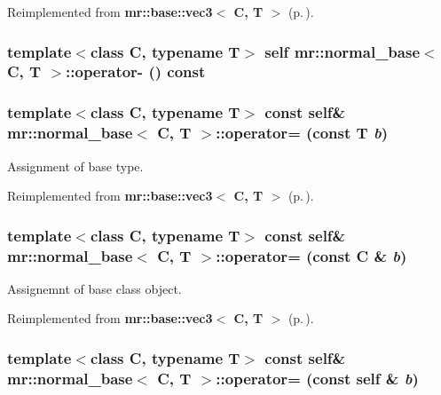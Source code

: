 Reimplemented from {\bf mr::base::vec3$<$ C, T $>$} {\rm (p.\,\pageref{structmr_1_1base_1_1vec3_z40_7})}.
\subsubsection{\setlength{\rightskip}{0pt plus 5cm}template$<$class C, typename T$>$ {\bf self} {\bf mr::normal\_\-base}$<$ C, T $>$::operator- () const\hspace{0.3cm}{\tt  [inline]}}\label{structmr_1_1normal__base_a16}


\subsubsection{\setlength{\rightskip}{0pt plus 5cm}template$<$class C, typename T$>$ const {\bf self}\& {\bf mr::normal\_\-base}$<$ C, T $>$::operator= (const T {\em b})\hspace{0.3cm}{\tt  [inline]}}\label{structmr_1_1normal__base_z69_3}


Assignment of base type. 



Reimplemented from {\bf mr::base::vec3$<$ C, T $>$} {\rm (p.\,\pageref{structmr_1_1base_1_1vec3_z36_3})}.
\subsubsection{\setlength{\rightskip}{0pt plus 5cm}template$<$class C, typename T$>$ const {\bf self}\& {\bf mr::normal\_\-base}$<$ C, T $>$::operator= (const C \& {\em b})\hspace{0.3cm}{\tt  [inline]}}\label{structmr_1_1normal__base_z69_2}


Assignemnt of base class object. 



Reimplemented from {\bf mr::base::vec3$<$ C, T $>$} {\rm (p.\,\pageref{structmr_1_1base_1_1vec3_z36_2})}.
\subsubsection{\setlength{\rightskip}{0pt plus 5cm}template$<$class C, typename T$>$ const {\bf self}\& {\bf mr::normal\_\-base}$<$ C, T $>$::operator= (const {\bf self} \& {\em b})\hspace{0.3cm}{\tt  [inline]}}\label{structmr_1_1normal__base_z69_1}


